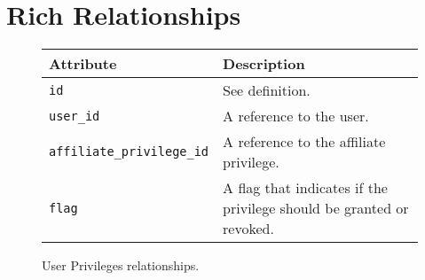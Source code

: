 \section{Rich Relationships}

\begin{figure}[htb]
\begin{center}
\begin{tabular}{ | l | p{8cm} | }
  \hline
    \textbf{Attribute} & \textbf{Description} \\ \hline
    \verb+id+ & See definition.\\ \hline
    \verb+user_id+ & A reference to the user.\\ \hline
    \verb+affiliate_privilege_id+ & A reference to the affiliate privilege.\\ \hline
    \verb+flag+ & A flag that indicates if the privilege should be granted or revoked.\\ \hline
\end{tabular}
\caption{User Privileges relationships.}
\label{tab:user_privileges_relationships}
\end{center}
\end{figure}
